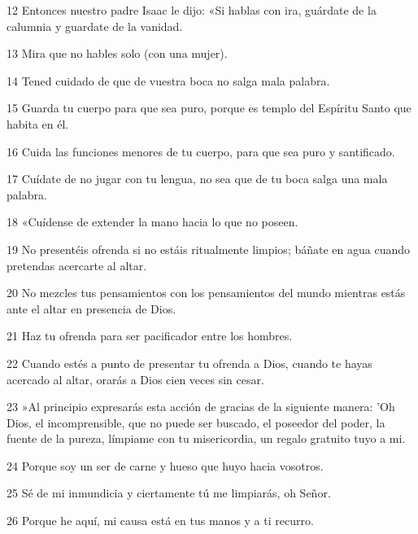 \par 12 Entonces nuestro padre Isaac le dijo: «Si hablas con ira, guárdate de la calumnia y guardate de la vanidad.

\par 13 Mira que no hables solo (con una mujer).

\par 14 Tened cuidado de que de vuestra boca no salga mala palabra.

\par 15 Guarda tu cuerpo para que sea puro, porque es templo del Espíritu Santo que habita en él.

\par 16 Cuida las funciones menores de tu cuerpo, para que sea puro y santificado.

\par 17 Cuídate de no jugar con tu lengua, no sea que de tu boca salga una mala palabra.

\par 18 «Cuídense de extender la mano hacia lo que no poseen.

\par 19 No presentéis ofrenda si no estáis ritualmente limpios; báñate en agua cuando pretendas acercarte al altar.

\par 20 No mezcles tus pensamientos con los pensamientos del mundo mientras estás ante el altar en presencia de Dios.

\par 21 Haz tu ofrenda para ser pacificador entre los hombres.

\par 22 Cuando estés a punto de presentar tu ofrenda a Dios, cuando te hayas acercado al altar, orarás a Dios cien veces sin cesar.

\par 23 »Al principio expresarás esta acción de gracias de la siguiente manera: 'Oh Dios, el incomprensible, que no puede ser buscado, el poseedor del poder, la fuente de la pureza, límpiame con tu misericordia, un regalo gratuito tuyo a mi.

\par 24 Porque soy un ser de carne y hueso que huyo hacia vosotros.

\par 25 Sé de mi inmundicia y ciertamente tú me limpiarás, oh Señor.

\par 26 Porque he aquí, mi causa está en tus manos y a ti recurro.

